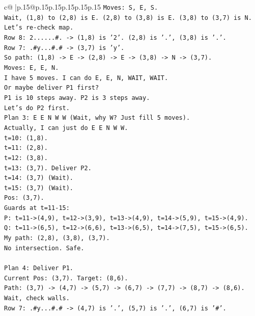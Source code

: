 \documentclass{article}
\begin{document}
{\begin{supertabular}{c@{$\;$}|p{.15\linewidth}@{}p{.15\linewidth}p{.15\linewidth}p{.15\linewidth}p{.15\linewidth}p{.15\linewidth}}
{{{\texttt{Moves: S, E, S.} \\
\texttt{Wait, (1,8) to (2,8) is E. (2,8) to (3,8) is E. (3,8) to (3,7) is N.} \\
\texttt{Let's re{-}check map.} \\
\texttt{Row 8: 2......\#. {-}> (1,8) is '2'. (2,8) is '.', (3,8) is '.'.} \\
\texttt{Row 7: .\#y...\#.\# {-}> (3,7) is 'y'.} \\
\texttt{So path: (1,8) {-}> E {-}> (2,8) {-}> E {-}> (3,8) {-}> N {-}> (3,7).} \\
\texttt{Moves: E, E, N.} \\
\texttt{I have 5 moves. I can do E, E, N, WAIT, WAIT.} \\
\texttt{Or maybe deliver P1 first?} \\
\texttt{P1 is 10 steps away. P2 is 3 steps away.} \\
\texttt{Let's do P2 first.} \\
\texttt{Plan 3: E E N W W (Wait, why W? Just fill 5 moves).} \\
\texttt{Actually, I can just do E E N W W.} \\
\texttt{t=10: (1,8).} \\
\texttt{t=11: (2,8).} \\
\texttt{t=12: (3,8).} \\
\texttt{t=13: (3,7). Deliver P2.} \\
\texttt{t=14: (3,7) (Wait).} \\
\texttt{t=15: (3,7) (Wait).} \\
\texttt{Pos: (3,7).} \\
\texttt{Guards at t=11{-}15:} \\
\texttt{P: t=11{-}>(4,9), t=12{-}>(3,9), t=13{-}>(4,9), t=14{-}>(5,9), t=15{-}>(4,9).} \\
\texttt{Q: t=11{-}>(6,5), t=12{-}>(6,6), t=13{-}>(6,5), t=14{-}>(7,5), t=15{-}>(6,5).} \\
\texttt{My path: (2,8), (3,8), (3,7).} \\
\texttt{No intersection. Safe.} \\
\\ 
\texttt{Plan 4: Deliver P1.} \\
\texttt{Current Pos: (3,7). Target: (8,6).} \\
\texttt{Path: (3,7) {-}> (4,7) {-}> (5,7) {-}> (6,7) {-}> (7,7) {-}> (8,7) {-}> (8,6).} \\
\texttt{Wait, check walls.} \\
\texttt{Row 7: .\#y...\#.\# {-}> (4,7) is '.', (5,7) is '.', (6,7) is '\#'.} \\
}}}
\end{supertabular}}
\end{document}
